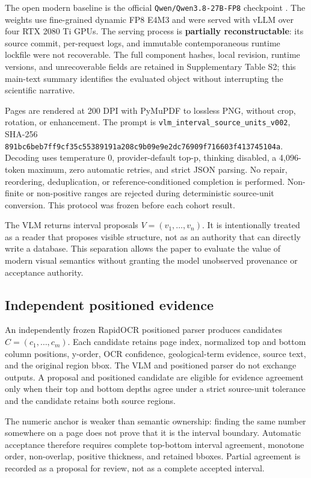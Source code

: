 \documentclass[a4paper,fleqn]{cas-sc}
\newcommand{\hash}[1]{\mbox{\texttt{#1}}}
\begin{document}
The open modern baseline is the official \texttt{Qwen/Qwen3.8-27B-FP8} checkpoint \citep{qwen2026qwen38}. The weights use fine-grained dynamic FP8 E4M3 and were served with vLLM over four RTX 2080 Ti GPUs. The serving process is \textbf{partially reconstructable}: its source commit, per-request logs, and immutable contemporaneous runtime lockfile were not recoverable. The full component hashes, local revision, runtime versions, and unrecoverable fields are retained in Supplementary Table S2; this main-text summary identifies the evaluated object without interrupting the scientific narrative.

Pages are rendered at 200 DPI with PyMuPDF to lossless PNG, without crop, rotation, or enhancement. The prompt is \texttt{vlm\_interval\_source\_units\_v002}, SHA-256 \hash{891bc6beb7ff9cf35c55389191a208c9b09e9e2dc76909f716603f413745104a}. Decoding uses temperature 0, provider-default top-p, thinking disabled, a 4,096-token maximum, zero automatic retries, and strict JSON parsing. No repair, reordering, deduplication, or reference-conditioned completion is performed. Non-finite or non-positive ranges are rejected during deterministic source-unit conversion. This protocol was frozen before each cohort result.

The VLM returns interval proposals \(V=(v_1,\ldots,v_n)\). It is intentionally treated as a reader that proposes visible structure, not as an authority that can directly write a database. This separation allows the paper to evaluate the value of modern visual semantics without granting the model unobserved provenance or acceptance authority.

\subsection{Independent positioned evidence}

An independently frozen RapidOCR positioned parser produces candidates \(C=(c_1,\ldots,c_m)\). Each candidate retains page index, normalized top and bottom column positions, y-order, OCR confidence, geological-term evidence, source text, and the original region bbox. The VLM and positioned parser do not exchange outputs. A proposal and positioned candidate are eligible for evidence agreement only when their top and bottom depths agree under a strict source-unit tolerance and the candidate retains both source regions.

The numeric anchor is weaker than semantic ownership: finding the same number somewhere on a page does not prove that it is the interval boundary. Automatic acceptance therefore requires complete top-bottom interval agreement, monotone order, non-overlap, positive thickness, and retained bboxes. Partial agreement is recorded as a proposal for review, not as a complete accepted interval.
\end{document}
